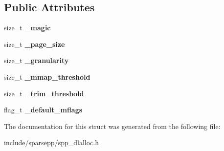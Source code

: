 \subsection*{Public Attributes}
\begin{DoxyCompactItemize}
\item 
size\+\_\+t {\bfseries \+\_\+magic}\hypertarget{structspp_1_1malloc__params_aff67965763720a6de4ba12f59302753c}{}\label{structspp_1_1malloc__params_aff67965763720a6de4ba12f59302753c}

\item 
size\+\_\+t {\bfseries \+\_\+page\+\_\+size}\hypertarget{structspp_1_1malloc__params_a79846b0c29d083aaa0d7852b8e0e1b21}{}\label{structspp_1_1malloc__params_a79846b0c29d083aaa0d7852b8e0e1b21}

\item 
size\+\_\+t {\bfseries \+\_\+granularity}\hypertarget{structspp_1_1malloc__params_a20f5b2b8e57e8fa6c0bf14bedac1c892}{}\label{structspp_1_1malloc__params_a20f5b2b8e57e8fa6c0bf14bedac1c892}

\item 
size\+\_\+t {\bfseries \+\_\+mmap\+\_\+threshold}\hypertarget{structspp_1_1malloc__params_aeeeae2fe3c3ad8331fe0286fb923f14c}{}\label{structspp_1_1malloc__params_aeeeae2fe3c3ad8331fe0286fb923f14c}

\item 
size\+\_\+t {\bfseries \+\_\+trim\+\_\+threshold}\hypertarget{structspp_1_1malloc__params_aca4f5d888d73074a5c9fa72a7aaafbcf}{}\label{structspp_1_1malloc__params_aca4f5d888d73074a5c9fa72a7aaafbcf}

\item 
flag\+\_\+t {\bfseries \+\_\+default\+\_\+mflags}\hypertarget{structspp_1_1malloc__params_ad58bac330e2b2144b4a7035a237b89f7}{}\label{structspp_1_1malloc__params_ad58bac330e2b2144b4a7035a237b89f7}

\end{DoxyCompactItemize}


The documentation for this struct was generated from the following file\+:\begin{DoxyCompactItemize}
\item 
include/sparsepp/spp\+\_\+dlalloc.\+h\end{DoxyCompactItemize}
